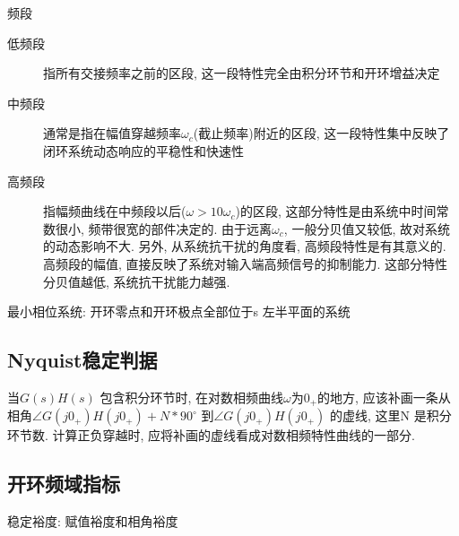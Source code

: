 频段
\begin{description}
	\item[低频段] 指所有交接频率之前的区段, 这一段特性完全由积分环节和开环增益决定
	\item[中频段] 通常是指在幅值穿越频率$\omega_c$(截止频率)附近的区段, 这一段特性集中反映了闭环系统动态响应的平稳性和快速性
	\item[高频段] 指幅频曲线在中频段以后($\omega > 10\omega_c$)的区段, 这部分特性是由系统中时间常数很小, 频带很宽的部件决定的. 由于远离$\omega_c$, 一般分贝值又较低, 故对系统的动态影响不大. 另外, 从系统抗干扰的角度看, 高频段特性是有其意义的. 高频段的幅值, 直接反映了系统对输入端高频信号的抑制能力. 这部分特性分贝值越低, 系统抗干扰能力越强.
\end{description}

最小相位系统: 开环零点和开环极点全部位于s 左半平面的系统
\subsection{Nyquist稳定判据}
当$G(s)H(s)$ 包含积分环节时, 在对数相频曲线$\omega$为$0_+$的地方, 应该补画一条从相角$\angle G(j0_+)H(j0_+)+N*90^\circ$ 到$\angle G(j0_+)H(j0_+)$
的虚线, 这里N 是积分环节数.\newline
计算正负穿越时, 应将补画的虚线看成对数相频特性曲线的一部分.

\subsection{开环频域指标}
稳定裕度: 赋值裕度和相角裕度

